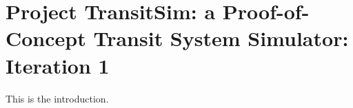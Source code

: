 \hypertarget{index_intro_sec}{}\section{Project Transit\+Sim\+: a Proof-\/of-\/\+Concept Transit System Simulator\+: Iteration 1}\label{index_intro_sec}
This is the introduction. 